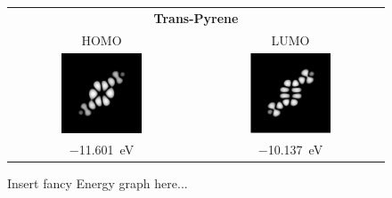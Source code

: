 
	\graphicspath{{./images/molecules/orbitals/trans-pyrene/}}
	\begin{figure}[]
		\begin{minipage}{0.2\textwidth} \centering
		\end{minipage}
		\hfill
		\begin{minipage}{0.4\textwidth} \centering 
			\begin{tabular}{c|c}
				\multicolumn{2}{c}{\textbf{Trans-Pyrene}} \\
				HOMO & LUMO \\
				\includegraphics[width=0.45\textwidth]{homo} &
				\includegraphics[width=0.45\textwidth]{lumo} \\
				\SI{-11.601}{\electronvolt} & \SI{-10.137 }{\electronvolt} \\
			\end{tabular}
		\end{minipage}
		\hfill
		\begin{minipage}{0.2\textwidth} \centering
			Insert fancy Energy graph here...	
		\end{minipage}
	\end{figure}
